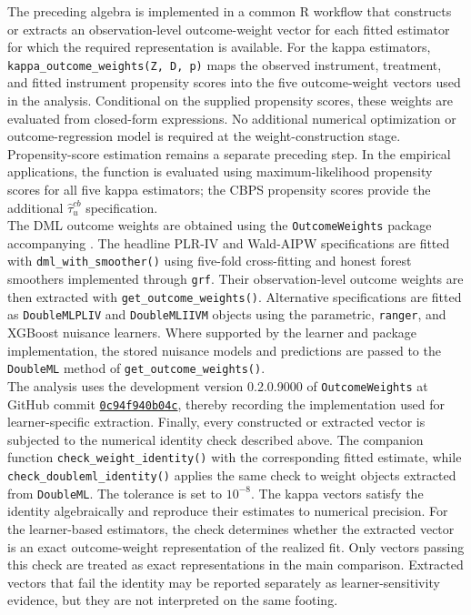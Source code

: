 \documentclass[12pt, a4paper, oneside]{article}
\theoremstyle{plain}
\theoremstyle{definition}
\begin{document}
\begin{sloppypar}

The preceding algebra is implemented in a common R workflow that constructs or
extracts an observation-level outcome-weight vector for each fitted estimator
for which the required representation is available. For the kappa estimators,
\texttt{kappa\_outcome\_weights(Z, D, p)} maps the observed instrument,
treatment, and fitted instrument propensity scores into the five
outcome-weight vectors used in the analysis. Conditional on the supplied
propensity scores, these weights are evaluated from closed-form expressions. No additional numerical optimization or outcome-regression model is required
at the weight-construction stage. Propensity-score estimation remains a
separate preceding step. In the empirical applications, the function is
evaluated using maximum-likelihood propensity scores for all five kappa
estimators; the CBPS propensity scores provide the additional
\(\widehat\tau_u^{cb}\) specification.\\
The DML outcome weights are obtained using the \texttt{OutcomeWeights} package
accompanying \citet{knaus2024treatment}. The headline PLR-IV and Wald-AIPW
specifications are fitted with \texttt{dml\_with\_smoother()} using five-fold
cross-fitting and honest forest smoothers implemented through \texttt{grf}.
Their observation-level outcome weights are then extracted with
\texttt{get\_outcome\_weights()}. Alternative specifications are fitted as
\texttt{DoubleMLPLIV} and \texttt{DoubleMLIIVM} objects using the parametric,
\texttt{ranger}, and XGBoost nuisance learners. Where supported by the learner and package implementation,
the stored nuisance models and predictions are passed to the
\texttt{DoubleML} method of \texttt{get\_outcome\_weights()}.\\
The analysis uses the development
version 0.2.0.9000 of \texttt{OutcomeWeights} at GitHub commit
\href{https://github.com/MCKnaus/OutcomeWeights/commit/0c94f940b04c14d0247b46842af37752e306b79e}{\texttt{0c94f940b04c}}, thereby
recording the implementation used for learner-specific extraction.
Finally, every constructed or extracted vector is subjected to the numerical
identity check described above. The companion function
\texttt{check\_weight\_identity()} with the corresponding fitted estimate, while
\texttt{check\_doubleml\_identity()} applies the same check to weight objects
extracted from \texttt{DoubleML}. The tolerance is set to \(10^{-8}\). The
kappa vectors satisfy the identity algebraically and reproduce their estimates
to numerical precision. For the learner-based estimators, the check determines
whether the extracted vector is an exact outcome-weight representation of the
realized fit. Only vectors passing this check are treated as exact
representations in the main comparison. Extracted vectors that fail the
identity may be reported separately as learner-sensitivity evidence, but they
are not interpreted on the same footing.
\end{sloppypar}
\newpage
\end{document}

